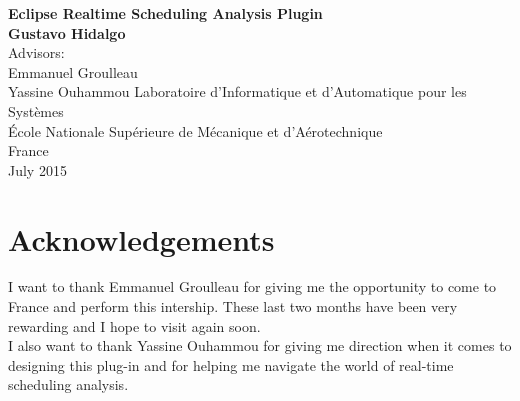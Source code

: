 \documentclass[a4paper]{article}
\begin{document}
\begin{titlepage}
    \begin{center}
	\vspace*{1cm}
	\huge
	\textbf{Eclipse Realtime Scheduling Analysis Plugin} \\
	\vspace{5cm}
	\large
	\textbf{Gustavo Hidalgo} \\
	\vspace{10cm}
	Advisors: \\
	Emmanuel Groulleau \\
	Yassine Ouhammou
	\vfill
	\vspace{0.8cm}
	Laboratoire d'Informatique et d'Automatique pour les Systèmes\\
	École Nationale Supérieure de Mécanique et d’Aérotechnique\\
	France\\
	July 2015
    \end{center}
\end{titlepage}
\tableofcontents
\pagebreak


% 






\section{Acknowledgements}
I want to thank Emmanuel Groulleau for giving me the opportunity to come to France and perform this intership. These last two months have been very rewarding and I hope to visit again soon. \\
I also want to thank Yassine Ouhammou for giving me direction when it comes to designing this plug-in and for helping me navigate the world of real-time scheduling analysis.
\end{document}
